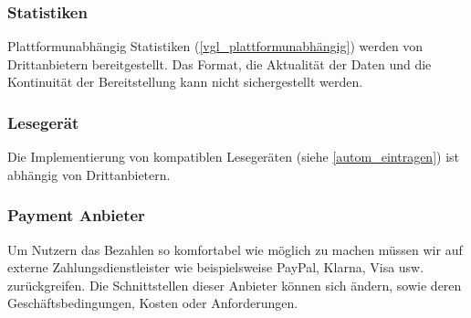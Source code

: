\subsubsection{Statistiken}
    Plattformunabhängig Statistiken (\ref{vgl_plattformunabhängig}) werden von Drittanbietern bereitgestellt. Das Format, die Aktualität der Daten und die Kontinuität der Bereitstellung kann nicht sichergestellt werden. 


\subsubsection{Lesegerät}
    Die Implementierung von kompatiblen Lesegeräten (siehe \ref{autom_eintragen}) ist abhängig von Drittanbietern.
\subsubsection{Payment Anbieter}

    Um Nutzern das Bezahlen so komfortabel wie möglich zu machen müssen wir auf externe Zahlungsdienstleister wie beispielsweise PayPal, Klarna, Visa usw. zurückgreifen. Die Schnittstellen dieser Anbieter können sich ändern, sowie deren Geschäftsbedingungen, Kosten oder Anforderungen. 
    